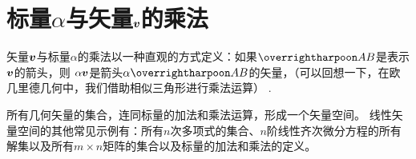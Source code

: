 \section{\texorpdfstring{标量$\alpha$与矢量$\boldsymbol{v}$的乘法}{标量α与矢量v的乘法}}

矢量$\boldsymbol{v}$与标量$\alpha$的乘法以一种直观的方式定义：如果$\rr{AB}$是表示$\boldsymbol{v}$的箭头，则 $\alpha \boldsymbol{v}$是箭头$\alpha \rr{AB}$的矢量，（可以回想一下，在欧几里德几何中，我们借助相似三角形进行乘法运算） .

所有几何矢量的集合，连同标量的加法和乘法运算，形成一个矢量空间。 线性矢量空间的其他常见示例有：所有$n$次多项式的集合、$n$阶线性齐次微分方程的所有解集以及所有$m\times n$矩阵的集合以及标量的加法和乘法的定义。